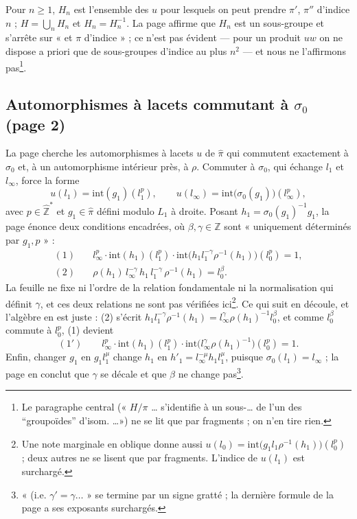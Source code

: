 \documentclass[11pt,a4paper]{article}
\begin{document}
Pour $n \geq 1$, $H_n$ est l'ensemble des $u$ pour lesquels on peut prendre
$\pi'$, $\pi''$ d'indice $n$ ; $H = \bigcup_n H_n$ et $H_n = H_n^{-1}$. La
page affirme que $H_n$ est un sous-groupe et s'arrête sur « et $\pi$
d'indice » ; ce n'est pas évident — pour un produit $uw$ on ne dispose a
priori que de sous-groupes d'indice au plus $n^2$ — et nous ne
l'affirmons pas\footnote{Le paragraphe central (« $H/\pi$ … s'identifie à un
sous-\ldots{} de l'un des “groupoïdes” d'isom. \ldots ») ne se lit que par
fragments ; on n'en tire rien.}.

\subsection*{Automorphismes à lacets commutant à $\sigma_0$ (page 2)}

La page cherche les automorphismes à lacets $u$ de $\widehat{\pi}$ qui
commutent exactement à $\sigma_0$ et, à un automorphisme intérieur près, à
$\rho$. Commuter à $\sigma_0$, qui échange $l_1$ et $l_\infty$, force la forme
\[
u(l_1) = \mathrm{int}(g_1)(l_1^{p}), \qquad
u(l_\infty) = \mathrm{int}\bigl(\sigma_0(g_1)\bigr)(l_\infty^{p}),
\]
avec $p \in \widehat{\mathbb{Z}}^{*}$ et $g_1 \in \widehat{\pi}$ défini modulo
$L_1$ à droite. Posant $h_1 = \sigma_0(g_1)^{-1} g_1$, la page énonce deux
conditions encadrées, où $\beta, \gamma \in \widehat{\mathbb{Z}}$ sont « uniquement
déterminés par $g_1, p$ » :
\[
\begin{aligned}
(1)\quad & l_\infty^{p} \cdot \mathrm{int}(h_1)(l_1^{p}) \cdot
\mathrm{int}\bigl(h_1 l_1^{-\gamma} \rho^{-1}(h_1)\bigr)(l_0^{p}) = 1, \\
(2)\quad & \rho(h_1)\, l_\infty^{-\gamma}\, h_1\, l_1^{-\gamma}\, \rho^{-1}(h_1)
= l_0^{\beta}.
\end{aligned}
\]
La feuille ne fixe ni l'ordre de la relation fondamentale ni la normalisation
qui définit $\gamma$, et ces deux relations ne sont pas vérifiées
ici\footnote{Une note marginale en oblique donne aussi
$u(l_0) = \mathrm{int}\bigl(g_1 l_1 \rho^{-1}(h_1)\bigr)(l_0^{p})$ ; deux autres
ne se lisent que par fragments. L'indice de $u(l_1)$ est surchargé.}. Ce qui
suit en découle, et l'algèbre en est juste : (2) s'écrit $h_1 l_1^{-\gamma}
\rho^{-1}(h_1) = l_\infty^{\gamma} \rho(h_1)^{-1} l_0^{\beta}$, et comme
$l_0^{\beta}$ commute à $l_0^{p}$, (1) devient
\[
(1')\qquad l_\infty^{p} \cdot \mathrm{int}(h_1)(l_1^{p}) \cdot
\mathrm{int}\bigl(l_\infty^{\gamma} \rho(h_1)^{-1}\bigr)(l_0^{p}) = 1 .
\]
Enfin, changer $g_1$ en $g_1 l_1^{\mu}$ change $h_1$ en $h'_1 = l_\infty^{-\mu}
h_1 l_1^{\mu}$, puisque $\sigma_0(l_1) = l_\infty$ ; la page en conclut que
$\gamma$ se décale et que $\beta$ ne change pas\footnote{« (i.e. $\gamma' =
\gamma \ldots$ » se termine par un signe gratté ; la dernière formule de la
page a ses exposants surchargés.}.
\end{document}
